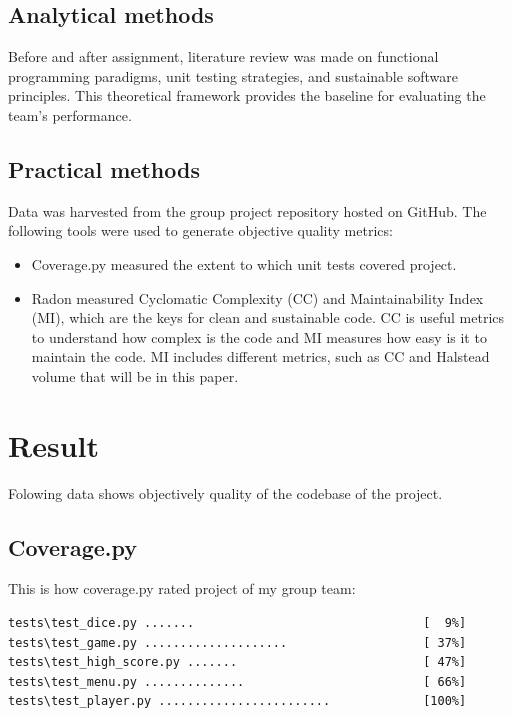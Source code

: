 \documentclass{article}
\begin{document}
\subsection{Analytical methods}
Before and after assignment, literature review was made on functional programming paradigms, unit testing strategies, and sustainable software principles. This theoretical framework provides the baseline for evaluating the team’s performance.

\subsection{Practical methods}
Data was harvested from the group project repository hosted on GitHub. The following tools were used to generate objective quality metrics:
\begin{itemize}
    \item Coverage.py \cite{a2025_coveragepy} measured the extent to which unit tests covered project.
    \item Radon measured Cyclomatic Complexity (CC) and Maintainability Index (MI), which are the keys for clean and sustainable code. CC is useful metrics to understand how complex is the code and MI measures how easy is it to maintain the code. MI includes different metrics, such as CC and Halstead volume that will be in this paper.
\end{itemize}


\newpage

\section{Result}
Folowing data shows objectively quality of the codebase of the project.
\subsection{Coverage.py}
This is how coverage.py rated project of my group team:
\begin{verbatim}
tests\test_dice.py .......                                [  9%]
tests\test_game.py ....................                   [ 37%]
tests\test_high_score.py .......                          [ 47%]
tests\test_menu.py ..............                         [ 66%]
tests\test_player.py ........................             [100%]
\end{verbatim}
\end{document}
